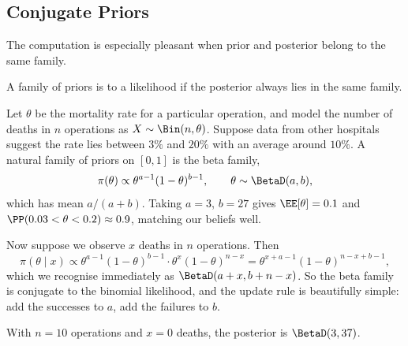 \subsection{Conjugate Priors}

The computation is especially pleasant when prior and posterior belong to the same family.

\begin{definition}[Conjugacy]
  A family of priors is  to a likelihood if the posterior always lies in the same family.
\end{definition}

\begin{example}
  Let $\theta$ be the mortality rate for a particular operation, and model the number of deaths in $n$ operations as $X \sim \Bin(n, \theta)$. Suppose data from other hospitals suggest the rate lies between $3\%$ and $20\%$ with an average around $10\%$. A natural family of priors on $[0,1]$ is the beta family,
  $$
  \pi(\theta) \propto \theta^{a-1}(1-\theta)^{b-1}, \qquad \theta \sim \BetaD(a,b),
  $$
  which has mean $a/(a+b)$. Taking $a = 3$, $b = 27$ gives $\EE[\theta] = 0.1$ and $\PP(0.03 < \theta < 0.2) \approx 0.9$, matching our beliefs well.

  Now suppose we observe $x$ deaths in $n$ operations. Then
  $$
  \pi(\theta \mid x) \propto \theta^{a-1}(1-\theta)^{b-1}\cdot\theta^x(1-\theta)^{n-x} = \theta^{x + a - 1}(1-\theta)^{n - x + b -1},
  $$
  which we recognise immediately as $\BetaD(a + x, b + n - x)$. So the beta family is conjugate to the binomial likelihood, and the update rule is beautifully simple: add the successes to $a$, add the failures to $b$.

  With $n = 10$ operations and $x = 0$ deaths, the posterior is $\BetaD(3, 37)$.


\end{example}
